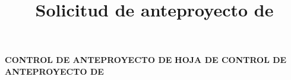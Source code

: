 
\graphicspath{{../../logos/}{../../figures/}{../../diagrams/}} %
 

\title{Solicitud de anteproyecto de \myWorkTypeFull} %
\date{\myThesisProposalDate}                               %
\author{\myAuthorFullName}


\pagestyle{empty}

% 


% 

\begin{spacing}{1.0}
\begin{center}

  {
    \Large\textbf{CONTROL DE ANTEPROYECTO DE \MakeUppercase{\myWorkType}}
  }
  {
    \Large\textbf{HOJA DE CONTROL DE ANTEPROYECTO DE \MakeUppercase{\myWorkType}}
  }

  \myDepartment

\end{center}
\end{spacing}
\vspace{0.5cm}

